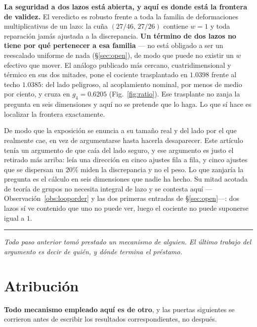 \documentclass[11pt,a4paper]{article}
\newcommand{\bridge}[1]{\par\medskip\noindent
  \textcolor{hdrblue!45}{\rule{2.2cm}{0.6pt}}\;\;\parbox[t]{0.84\textwidth}{\small\itshape
  \textcolor{hdrblue!85}{#1}}\par\medskip}
\newenvironment{keyeq}
  {\begin{center}\setlength{\fboxsep}{9pt}\setlength{\fboxrule}{0.8pt}%
   \begin{lrbox}{\keyeqbox}\begin{minipage}{0.88\textwidth}}
  {\end{minipage}\end{lrbox}%
   \fcolorbox{hdrblue!55}{hdrblue!6}{\usebox{\keyeqbox}}\end{center}}
\begin{document}
\begin{keyeq}
\textbf{La seguridad a dos lazos está abierta, y aquí es donde está la frontera de validez.} El
veredicto es robusto frente a toda la familia de deformaciones multiplicativas de un lazo: la cuña
$(27/46,\,27/26)$ contiene $w=1$ y toda reparación jamás ajustada a la discrepancia. \textbf{Un
término de dos lazos no tiene por qué pertenecer a esa familia} --- no está obligado a ser un
reescalado uniforme de nada (\S\ref{sec:open}), de modo que puede no existir un $w$ efectivo que
mover. El análogo publicado más cercano, cuatridimensional y térmico en sus dos mitades, pone el
cociente trasplantado en $1.0398$ frente al techo $1.0385$: del lado peligroso, al acoplamiento
nominal, por menos de medio por ciento, y cruza en $g_4=0.6205$ (Fig.~\ref{fig:ratio}). Ese
trasplante no zanja la pregunta en seis dimensiones y
aquí no se pretende que lo haga. Lo que sí hace es localizar la frontera exactamente.
\end{keyeq}

\noindent
De modo que la exposición se enuncia a su tamaño real y del lado por el que realmente cae, en vez de
argumentarse hasta hacerla desaparecer. Este artículo tenía un argumento de que caía del lado
seguro, y ese argumento es justo el retirado más arriba: leía una dirección en cinco ajustes fila a
fila, y cinco ajustes que se dispersan un $20\%$ miden la discrepancia y no el peso. Lo que
zanjaría la pregunta es el cálculo en seis dimensiones que nadie ha hecho. Su mitad acotada de teoría
de grupos no necesita integral de lazo y se contesta aquí ---Observación~\ref{obs:looporder} y las
dos primeras entradas de \S\ref{sec:open}---: dos lazos sí ve contenido que uno no puede ver, luego
el cociente no puede suponerse igual a $1$.

\bridge{Todo paso anterior tomó prestado un mecanismo de alguien. El último trabajo del argumento es
decir de quién, y dónde termina el préstamo.}

\section{Atribución}\label{sec:scope}

\textbf{Todo mecanismo empleado aquí es de otro}, y las puertas siguientes se corrieron antes de
escribir los resultados correspondientes, no después.
\end{document}
